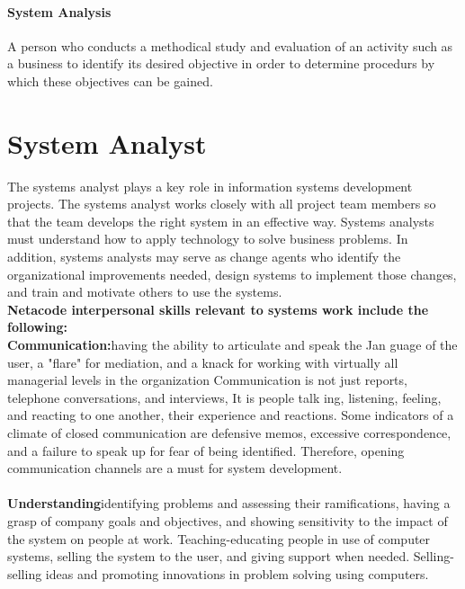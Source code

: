 \documentclass[a4paper,12pt]{report}
\begin{document}
\paragraph{System Analysis} 
A person who conducts a methodical study and evaluation of an activity such as a business to identify its desired objective in order to determine procedurs by which these objectives can be gained.
\section{System Analyst}
The systems analyst plays a key role in information systems development projects. The systems analyst works closely with all project team members so that the team develops the right system in an effective way. Systems analysts must understand how to apply technology to solve business problems. In addition, systems analysts may serve as change agents who identify the organizational improvements needed, design systems to implement those changes, and train and motivate others to use the systems.\\
\textbf{Netacode interpersonal skills relevant to systems work include the following: }\\
\textbf{Communication:}having the ability to articulate and speak the Jan guage of the user, a "flare" for mediation, and a knack for working with virtually all managerial levels in the organization Communication is not just reports, telephone conversations, and interviews, It is people talk ing, listening, feeling, and reacting to one another, their experience and reactions. Some indicators of a climate of closed communication are defensive memos, excessive correspondence, and a failure to speak up for fear of being identified. Therefore, opening communication channels are a must for system development.\\  \\
\textbf{Understanding}identifying problems and assessing their ramifications, having a grasp of company goals and objectives, and showing sensitivity to the impact of the system on people at work.
Teaching-educating people in use of computer systems, selling the system to the user, and giving support when needed. Selling-selling ideas and promoting innovations in problem solving using computers.
\end{document}
